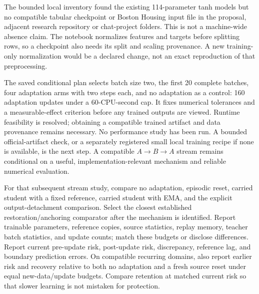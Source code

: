 \documentclass[11pt,a4paper]{article}
\begin{document}
The bounded local inventory found the existing 114-parameter tanh models
but no compatible tabular checkpoint or Boston Housing input file in the
proposal, adjacent research repository or chat-project folders. This is
not a machine-wide absence claim. The notebook normalizes features and
targets before splitting rows, so a checkpoint also needs its split and
scaling provenance. A new training-only normalization would be a declared
change, not an exact reproduction of that preprocessing.

The saved conditional plan selects batch size two, the first 20 complete
batches, four adaptation arms with two steps each, and no adaptation as a
control: 160 adaptation updates under a 60-CPU-second cap. It fixes numerical
tolerances and a measurable-effect criterion before any trained outputs
are viewed. Runtime feasibility is resolved; obtaining a compatible trained
artifact and data provenance remains necessary. No performance study has
been run. A bounded official-artifact check, or a separately registered
small local training recipe if none is available, is the next step.
A compatible $A\to B\to A$ stream remains conditional on a useful,
implementation-relevant mechanism and reliable numerical evaluation.

For that subsequent stream study, compare no adaptation, episodic reset,
carried student with a fixed
reference, carried student with EMA, and the explicit output-detachment
comparison. Select the closest established restoration/anchoring comparator
after the mechanism is identified. Report trainable parameters, reference
copies, source statistics, replay memory, teacher batch statistics, and
update counts; match these budgets or disclose differences. Report current
pre-update risk, post-update risk, discrepancy, reference lag, and boundary
prediction errors. On compatible recurring domains, also report earlier
risk and recovery relative to both no adaptation and a fresh source reset
under equal new-data/update budgets. Compare retention at matched current
risk so that slower learning is not mistaken for protection.
\end{document}
